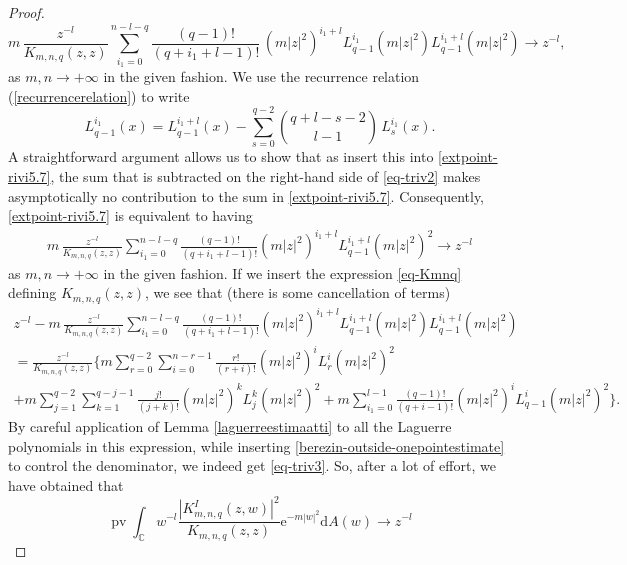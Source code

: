 \documentclass{birkart}
\theoremstyle{definition}
\theoremstyle{remark}
\numberwithin{equation}{section}
\numberwithin{figure}{section}
\newcommand{\e}{\mathrm e}
\newcommand{\1}{{\mathbf 1}}
\newcommand{\Rpar}{q}
\newcommand{\diff}{{\mathrm d}}
\newcommand{\pv}{\operatorname{\mathrm{pv}}}
\begin{document}
\begin{proof}
\begin{equation}
\label{extpoint-rivi5.7}
m\,\frac{z^{-l}}{K_{m,n,q}(z,z)}
\sum_{i_1=0}^{n-l-q}
\frac{(q-1)!}{(q+i_1+l-1)!}
\,(m|z|^{2})^{i_1+l}L_{q-1}^{i_1}(m|z|^2)L^{i_1+l}_{q-1}(m|z|^2)
\longrightarrow z^{-l},
\end{equation}
as $m,n\to+\infty$ in the given fashion.
We use the recurrence relation (\ref{recurrencerelation}) to write 
\begin{equation} 
\label{eq-triv2}
L^{i_1}_{\Rpar-1}(x) = L^{i_1+l}_{\Rpar-1}(x)- \sum_{s=0}^{\Rpar-2} 
\binom{q+l-s-2}{l-1}\, L^{i_1}_s(x).
\end{equation}
A straightforward argument allows us to show that as insert this into 
\eqref{extpoint-rivi5.7}, the sum that is subtracted on the right-hand
side of \eqref{eq-triv2} makes asymptotically no contribution to the sum
in \eqref{extpoint-rivi5.7}. Consequently, \eqref{extpoint-rivi5.7} is 
equivalent to having
\begin{align}
\label{eq-triv3}
m\,\frac{z^{-l}}{K_{m,n,\Rpar}(z,z)}\sum_{i_1=0}^{n-l-q} \frac{(\Rpar-1)!}
{(\Rpar+i_1+l-1)!} (m|z|^2)^{i_1+l} L^{i_1+l}_{\Rpar-1}(m|z|^2)^2
\longrightarrow z^{-l}  
\end{align}
as $m,n\to+\infty$ in the given fashion.
If we insert the expression \eqref{eq-Kmnq} defining $K_{m,n,q}(z,z)$, we 
see that (there is some cancellation of terms)
\begin{multline}
z^{-l}-m\,\frac{z^{-l}}{K_{m,n,\Rpar}(z,z)}\sum_{i_1=0}^{n-l-\Rpar} 
\frac{(\Rpar-1)!}
{(\Rpar+i_1+l-1)!} (m|z|^2)^{i_1+l} L^{i_1+l}_{\Rpar-1}(m|z|^2)
L^{i_1+l}_{\Rpar-1}(m|z|^2)  
\\
=\frac{z^{-l}}{K_{m,n,\Rpar}(z,z)}\Bigg\{
m\sum_{r=0}^{\Rpar-2}\sum_{i=0}^{n-r-1} \frac{r!}{(r+i)!} 
(m|z|^2)^i L_r^{i}(m|z|^2)^2 
\\
+m \sum_{j=1}^{\Rpar-2}\sum_{k=1}^{\Rpar-j-1} \frac{j!}{(j+k)!} 
(m|z|^2)^k L^{k}_{j}(m|z|^2)^2 
+m\sum_{i_1=0}^{l-1} \frac{(\Rpar-1)!}
{(\Rpar+i-1)!} (m|z|^2)^{i} L^{i}_{\Rpar-1}(m|z|^2)^2
\Bigg\}.
\end{multline}
By careful application of Lemma \ref{laguerreestimaatti} to all the
Laguerre polynomials in this expression, while inserting 
\eqref{berezin-outside-onepointestimate} to control the denominator, 
we indeed get \eqref{eq-triv3}. So, after a lot of effort, we have obtained
that
\begin{equation}
\label{eq-triv5}
\pv 
\int_{\mathbb{C}} w^{-l} 
\frac{|K^I_{m,n,\Rpar}(z,w)|^2}{K_{m,n,q}(z,z)}\e^{-m|w|^2} \diff A(w) 
\longrightarrow z^{-l}
\end{equation}

\end{proof}
\end{document}
